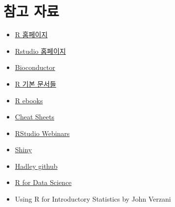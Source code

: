 \documentclass[
]{book}
\providecommand{\tightlist}{%
  \setlength{\itemsep}{0pt}\setlength{\parskip}{0pt}}
\begin{document}
\hypertarget{References}{%
\section{참고 자료}\label{References}}

\begin{itemize}
\tightlist
\item
  \href{https://www.r-project.org/}{R 홈페이지}
\item
  \href{https://www.rstudio.com/}{Rstudio 홈페이지}
\item
  \href{https://www.bioconductor.org/}{Bioconductor}
\item
  \href{https://cran.r-project.org/manuals.html}{R 기본 문서들}
\item
  \href{https://bookdown.org/}{R ebooks}
\item
  \href{https://www.rstudio.com/resources/cheatsheets/}{Cheat Sheets}
\item
  \href{https://resources.rstudio.com/}{RStudio Webinars}
\item
  \href{http://shiny.rstudio.com/tutorial/}{Shiny}
\item
  \href{https://github.com/hadley}{Hadley github}
\item
  \href{https://r4ds.had.co.nz}{R for Data Science}
\item
  Using R for Introductory Statistics by John Verzani


\end{itemize}
\end{document}
